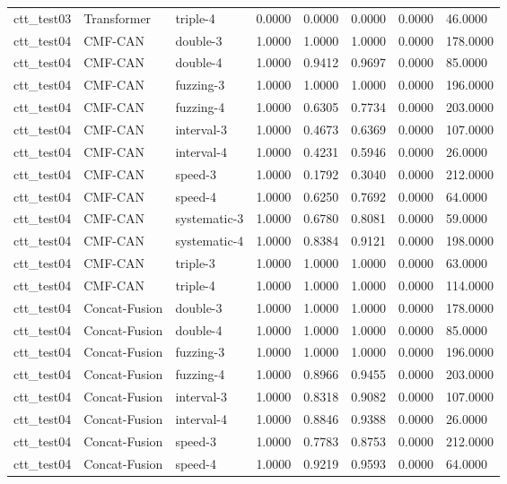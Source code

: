 \begin{tabular}{llllllll}
ctt_test03 & Transformer & triple-4 & 0.0000 & 0.0000 & 0.0000 & 0.0000 & 46.0000 \\
ctt_test04 & CMF-CAN & double-3 & 1.0000 & 1.0000 & 1.0000 & 0.0000 & 178.0000 \\
ctt_test04 & CMF-CAN & double-4 & 1.0000 & 0.9412 & 0.9697 & 0.0000 & 85.0000 \\
ctt_test04 & CMF-CAN & fuzzing-3 & 1.0000 & 1.0000 & 1.0000 & 0.0000 & 196.0000 \\
ctt_test04 & CMF-CAN & fuzzing-4 & 1.0000 & 0.6305 & 0.7734 & 0.0000 & 203.0000 \\
ctt_test04 & CMF-CAN & interval-3 & 1.0000 & 0.4673 & 0.6369 & 0.0000 & 107.0000 \\
ctt_test04 & CMF-CAN & interval-4 & 1.0000 & 0.4231 & 0.5946 & 0.0000 & 26.0000 \\
ctt_test04 & CMF-CAN & speed-3 & 1.0000 & 0.1792 & 0.3040 & 0.0000 & 212.0000 \\
ctt_test04 & CMF-CAN & speed-4 & 1.0000 & 0.6250 & 0.7692 & 0.0000 & 64.0000 \\
ctt_test04 & CMF-CAN & systematic-3 & 1.0000 & 0.6780 & 0.8081 & 0.0000 & 59.0000 \\
ctt_test04 & CMF-CAN & systematic-4 & 1.0000 & 0.8384 & 0.9121 & 0.0000 & 198.0000 \\
ctt_test04 & CMF-CAN & triple-3 & 1.0000 & 1.0000 & 1.0000 & 0.0000 & 63.0000 \\
ctt_test04 & CMF-CAN & triple-4 & 1.0000 & 1.0000 & 1.0000 & 0.0000 & 114.0000 \\
ctt_test04 & Concat-Fusion & double-3 & 1.0000 & 1.0000 & 1.0000 & 0.0000 & 178.0000 \\
ctt_test04 & Concat-Fusion & double-4 & 1.0000 & 1.0000 & 1.0000 & 0.0000 & 85.0000 \\
ctt_test04 & Concat-Fusion & fuzzing-3 & 1.0000 & 1.0000 & 1.0000 & 0.0000 & 196.0000 \\
ctt_test04 & Concat-Fusion & fuzzing-4 & 1.0000 & 0.8966 & 0.9455 & 0.0000 & 203.0000 \\
ctt_test04 & Concat-Fusion & interval-3 & 1.0000 & 0.8318 & 0.9082 & 0.0000 & 107.0000 \\
ctt_test04 & Concat-Fusion & interval-4 & 1.0000 & 0.8846 & 0.9388 & 0.0000 & 26.0000 \\
ctt_test04 & Concat-Fusion & speed-3 & 1.0000 & 0.7783 & 0.8753 & 0.0000 & 212.0000 \\
ctt_test04 & Concat-Fusion & speed-4 & 1.0000 & 0.9219 & 0.9593 & 0.0000 & 64.0000 \\

\end{tabular}
